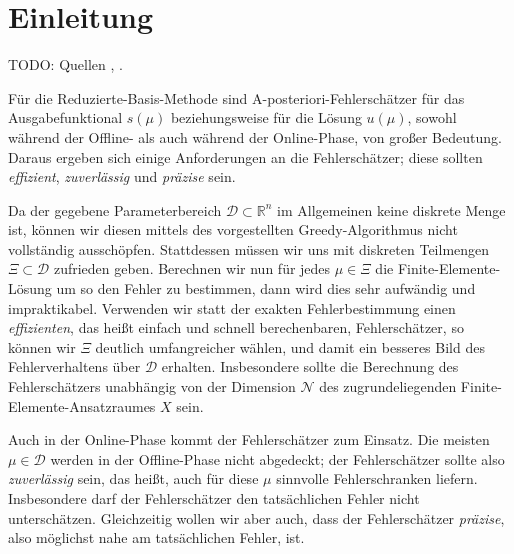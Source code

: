 
\section{Einleitung} %
\label{sec:einleitung}

TODO: Quellen \cite{Paro}, \cite{Stamm}.

Für die Reduzierte-Basis-Methode sind A-posteriori-Fehlerschätzer für das Ausgabefunktional $s(\mu)$ beziehungsweise für die Lösung $u(\mu)$, sowohl während der Offline- als auch während der Online-Phase, von großer Bedeutung.
Daraus ergeben sich einige Anforderungen an die Fehlerschätzer; diese sollten \emph{effizient}, \emph{zuverlässig} und \emph{präzise} sein.

Da der gegebene Parameterbereich $\mathcal D \subset \mathbb{R}^n$ im Allgemeinen keine diskrete Menge ist, können wir diesen mittels des vorgestellten Greedy-Algorithmus nicht vollständig ausschöpfen.
Stattdessen müssen wir uns mit diskreten Teilmengen $\Xi \subset \mathcal D$ zufrieden geben.
Berechnen wir nun für jedes $\mu \in \Xi$ die Finite-Elemente-Lösung um so den Fehler zu bestimmen, dann wird dies sehr aufwändig und impraktikabel.
Verwenden wir statt der exakten Fehlerbestimmung einen \emph{effizienten}, das heißt einfach und schnell berechenbaren, Fehlerschätzer, so können wir $\Xi$ deutlich umfangreicher wählen, und damit ein besseres Bild des Fehlerverhaltens über $\mathcal D$ erhalten.
Insbesondere sollte die Berechnung des Fehlerschätzers unabhängig von der Dimension $\mathcal N$ des zugrundeliegenden Finite-Elemente-Ansatzraumes $X$ sein.

Auch in der Online-Phase kommt der Fehlerschätzer zum Einsatz.
Die meisten $\mu \in \mathcal D$ werden in der Offline-Phase nicht abgedeckt; der Fehlerschätzer sollte also \emph{zuverlässig} sein, das heißt, auch für diese $\mu$ sinnvolle Fehlerschranken liefern.
Insbesondere darf der Fehlerschätzer den tatsächlichen Fehler nicht unterschätzen.
Gleichzeitig wollen wir aber auch, dass der Fehlerschätzer \emph{präzise}, also möglichst nahe am tatsächlichen Fehler, ist.

